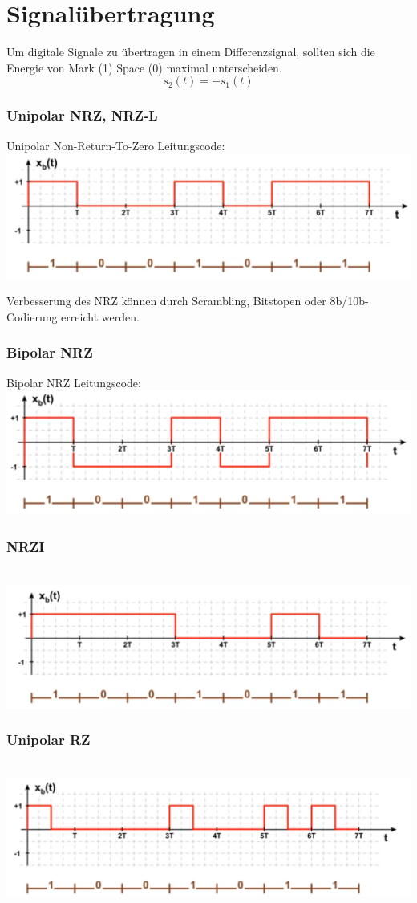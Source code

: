 \section{Signalübertragung}
Um digitale Signale zu übertragen in einem Differenzsignal, sollten sich die Energie von Mark (1) Space (0) maximal unterscheiden.
\[
s_2(t) = -s_1(t)
\]

\subsubsection{Unipolar NRZ, NRZ-L}
Unipolar Non-Return-To-Zero Leitungscode:\\
\includegraphics[width=0.6\columnwidth]{Images/nrz}

Verbesserung des NRZ können durch Scrambling, Bitstopen oder 8b/10b-Codierung erreicht werden.

\subsubsection{Bipolar NRZ}
Bipolar NRZ Leitungscode:\\
\includegraphics[width=0.6\columnwidth]{Images/nrz1}

\subsubsection{NRZI}\\
\includegraphics[width=0.6\columnwidth]{Images/nrzi}

\subsubsection{Unipolar RZ}\\
\includegraphics[width=0.6\columnwidth]{Images/urz}

